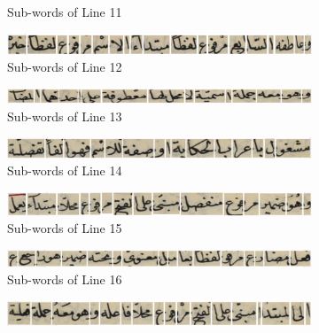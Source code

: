 \begin{figure}[H]
\begin{subfigure}[b]{0.3\textwidth}
         \caption{Sub-words of Line 11}
     \end{subfigure}
     \centering%
     \begin{subfigure}[b]{0.3\textwidth}
         \centering
         \includegraphics[width=\textwidth]{images/word-seg/line-12.png}
         \caption{Sub-words of Line 12}
     \end{subfigure}
     \centering%
     \begin{subfigure}[b]{0.3\textwidth}
         \centering
         \includegraphics[width=\textwidth]{images/word-seg/line-13.png}
         \caption{Sub-words of Line 13}
     \end{subfigure}
     \centering%
     \begin{subfigure}[b]{0.3\textwidth}
         \centering
         \includegraphics[width=\textwidth]{images/word-seg/line-14.png}
         \caption{Sub-words of Line 14}
     \end{subfigure}
     \centering%
     \begin{subfigure}[b]{0.3\textwidth}
         \centering
         \includegraphics[width=\textwidth]{images/word-seg/line-15.png}
         \caption{Sub-words of Line 15}
     \end{subfigure}
     \centering%
     \begin{subfigure}[b]{0.3\textwidth}
         \centering
         \includegraphics[width=\textwidth]{images/word-seg/line-16.png}
         \caption{Sub-words of Line 16}
     \end{subfigure}
     \centering%
     \begin{subfigure}[b]{0.3\textwidth}
         \centering
         \includegraphics[width=\textwidth]{images/word-seg/line-17.png}

\end{subfigure}
\end{figure}
